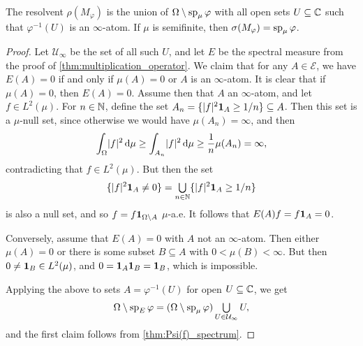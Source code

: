 \documentclass[article, a4paper, 11pt, oneside]{memoir}
\makeatletter
\let\phi\varphi
\numberwithin{equation}{chapter}
\newcommand{\calE}{\mathcal{E}}
\theoremstyle{myexample}
\theoremstyle{myexample}
\theoremstyle{myexamplebreak}
\theoremstyle{myexamplebreak}
\theoremstyle{nonumberplain}
\newtheorem{proof}{\protect\@proof}
\theoremstyle{MyNonumberplain}
\newcommand{\@proof}{}
\renewcommand{\@proof}{Proof}%
\renewcommand{\@proof}{Bevis}%
\makeatother
\begin{document}
\begin{proposition}
    \label{thm:multiplication_spectrum}
    The resolvent $\rho(M_\phi)$ is the union of $\Omega \setminus \essran_\mu \phi$ with all open sets $U \subseteq \mathbb{C}$ such that $\phi^{-1}(U)$ is an $\infty$-atom. If $\mu$ is semifinite, then $\sigma(M_\phi) = \essran_\mu \phi$.
\end{proposition}

\begin{proof}
    Let $\mathcal{U}_\infty$ be the set of all such $U$, and let $E$ be the spectral measure from the proof of \cref{thm:multiplication_operator}. We claim that for any $A \in \calE$, we have $E(A) = 0$ if and only if $\mu(A) = 0$ or $A$ is an $\infty$-atom. It is clear that if $\mu(A) = 0$, then $E(A) = 0$. Assume then that $A$ an $\infty$-atom, and let $f \in L^2(\mu)$. For $n \in \mathbb{N}$, define the set $A_n = \{ \lvert f\rvert^2 \mathbf{1}_{A} \geq 1/n \} \subseteq A$. Then this set is a $\mu$-null set, since otherwise we would have $\mu(A_n) = \infty$, and then
    \begin{equation*}
        \int_\Omega \lvert f\rvert^2 \mathop{}\!\mathrm{d} \mu
            \geq \int_{A_n} \lvert f\rvert^2 \mathop{}\!\mathrm{d} \mu
            \geq \frac{1}{n} \mu(A_n)
            = \infty,
    \end{equation*}
    contradicting that $f \in L^2(\mu)$. But then the set
    \begin{equation*}
        \{ \abs{f}^2 \indicator{A} \neq 0 \}
            = \bigunion_{n \in \setN} \{ \abs{f}^2 \indicator{A} \geq 1/n \}
    \end{equation*}
    is also a null set, and so $f = f \mathbf{1}_{\Omega \setminus A}$ $\mu$-a.e. It follows that $E(A) f = f \mathbf{1}_{A} = 0$.
    
    Conversely, assume that $E(A) = 0$ with $A$ not an $\infty$-atom. Then either $\mu(A) = 0$ or there is some subset $B \subseteq A$ with $0 < \mu(B) < \infty$. But then $0 \neq \mathbf{1}_{B} \in L^2(\mu)$, and $0 = \mathbf{1}_{A} \mathbf{1}_{B} = \mathbf{1}_{B}$, which is impossible.
    
    Applying the above to sets $A = \phi^{-1}(U)$ for open $U \subseteq \mathbb{C}$, we get
    \begin{equation*}
        \Omega \setminus \essran_E \phi
            = (\Omega \setminus \essran_\mu \phi)
            \bigunion_{U \in \mathcal{U}_\infty} U,
    \end{equation*}
    and the first claim follows from \cref{thm:Psi(f)_spectrum}.
    

\end{proof}
\end{document}
